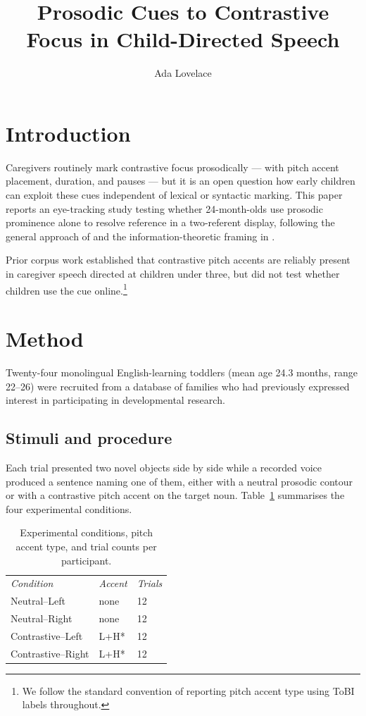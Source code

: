 \documentclass{cascadilla}
\title{Prosodic Cues to Contrastive Focus in Child-Directed Speech}
\author{Ada Lovelace}
\begin{document}
\maketitle

\section{Introduction}
Caregivers routinely mark contrastive focus prosodically --- with
pitch accent placement, duration, and pauses --- but it is an open
question how early children can exploit these cues independent of
lexical or syntactic marking. This paper reports an eye-tracking study
testing whether 24-month-olds use prosodic prominence alone to resolve
reference in a two-referent display, following the general approach of
\citet{Shosted2006} and the information-theoretic framing in
\citet{Shannon1948}.

Prior corpus work \citep{Goodman1943} established that contrastive
pitch accents are reliably present in caregiver speech directed at
children under three, but did not test whether children use the cue
online.\footnote{We follow the standard convention of reporting pitch
accent type using ToBI labels throughout.}

\section{Method}
Twenty-four monolingual English-learning toddlers (mean age 24.3
months, range 22--26) were recruited from a database of families who
had previously expressed interest in participating in developmental
research.

\subsection{Stimuli and procedure}
Each trial presented two novel objects side by side while a recorded
voice produced a sentence naming one of them, either with a neutral
prosodic contour or with a contrastive pitch accent on the target
noun. Table~\ref{tab:conditions} summarises the four experimental
conditions.

\begin{table}
    \centering
    \begin{tabular}{lll}
        \emph{Condition} & \emph{Accent} & \emph{Trials} \\
        Neutral--Left & none & 12 \\
        Neutral--Right & none & 12 \\
        Contrastive--Left & L+H* & 12 \\
        Contrastive--Right & L+H* & 12
    \end{tabular}
    \caption{Experimental conditions, pitch accent type, and trial
    counts per participant.}
    \label{tab:conditions}
\end{table}
\end{document}
